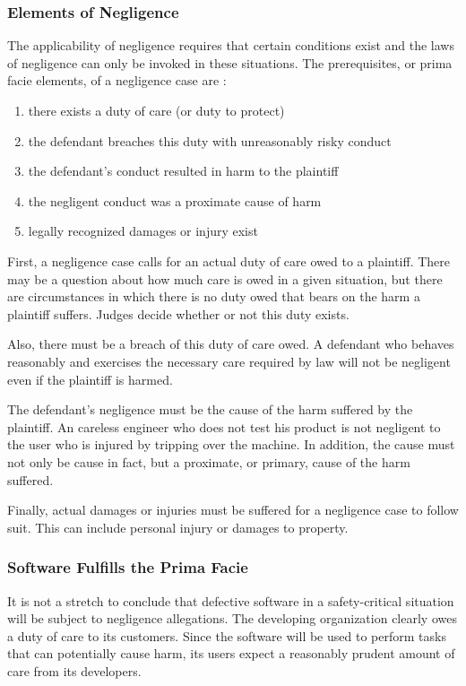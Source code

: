 \subsubsection{Elements of Negligence}\label{SS:Elements}
The applicability of negligence requires that certain conditions exist and the
laws of negligence can only be invoked in these situations. The prerequisites,
or prima facie elements, of a negligence case are \cite{Dobbs01}:

\singlespace
\begin{enumerate}
 \item there exists a duty of care (or duty to protect)
 \item the defendant breaches this duty with unreasonably risky conduct
 \item the defendant's conduct resulted in harm to the plaintiff
 \item the negligent conduct was a proximate cause of harm
 \item legally recognized damages or injury exist
\end{enumerate}
\doublespace

First, a negligence case calls for an actual duty of care owed to a plaintiff.
There may be a question about how much care is owed in a given situation, but
there are circumstances in which there is no duty owed that bears on the harm a
plaintiff suffers. Judges decide whether or not this duty exists.

Also, there must be a breach of this duty of care owed. A defendant who behaves
reasonably and exercises the necessary care required by law will not be
negligent even if the plaintiff is harmed.

The defendant's negligence must be the cause of the harm suffered by the
plaintiff. An careless engineer who does not test his product is not negligent
to the user who is injured by tripping over the machine. In addition, the cause
must not only be cause in fact, but a proximate, or primary, cause of the harm
suffered.

Finally, actual damages or injuries must be suffered for a negligence case to
follow suit. This can include personal injury or damages to property.

\subsubsection{Software Fulfills the Prima Facie}

It is not a stretch to conclude that defective software in a safety-critical
situation will be subject to negligence allegations. The developing
organization clearly owes a duty of care to its customers. Since the software
will be used to perform tasks that can potentially cause harm, its users expect
a reasonably prudent amount of care from its developers.

